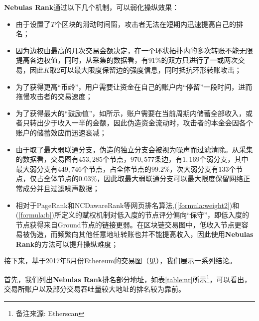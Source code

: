 \textbf{Nebulas Rank}通过以下几个机制，可以弱化操纵效果：
\begin{itemize}
	\item 由于设置了$T$个区块的滑动时间窗，攻击者无法在短期内迅速提高自己的排名；
	\item 因为边权由最高的几次交易金额决定，在一个环状拓扑内的多次转账不能无限提高各边权值，同时，从采集的数据看，有$91\%$的双方只进行了一或两次交易，因此$K$取$2$可以最大限度保留边的强度信息，同时抵抗环形转账攻击；
	\item 为了获得更高“币龄”，用户需要让资金在自己的账户内“停留”一段时间，进而拖慢攻击者的交易速度；
	\item 为了获得最大的“鼓励值”，如所示，账户需要在当前周期内储蓄全部收入，或者只转出少于收入一半的金额，因此伪造资金流动时，攻击者的本金会因各个账户的储蓄效应而迅速衰减；
	\item 由于取了最大弱联通分支，伪造的独立分支会被视为噪声而过滤清除。从采集的数据看，交易图有$453,285$个节点，$970,577$条边，有$1,169$个弱分支，其中最大弱分支有$449,746$个节点，占全体节点的$99.2\%$，次大弱分支有$133$个节点，仅占全体节点的$0.03\%$，因此取最大弱联通分支可以最大限度保留网络正常成分并且过滤噪声数据；
	\item 相对于PageRank和NCDawareRank\cite{Nikolakopoulos2013}等网页排名算法,(\ref{formula:weight2})和(\ref{formula:b})所定义的赋权机制对低入度的节点评分偏向“保守”，即低入度的节点获得来自Ground节点的链接更弱。在区块链交易图中，低收入节点更容易被伪造，而频繁向其他任意地址转账也并不能提高收入，因此使用\textbf{Nebulas Rank}的方法可以提升操纵难度；
\end{itemize}

接下来，基于2017年5月份Ethereum的交易图（见），我们展示一系列结论。

首先，我们列出\textbf{Nebulas Rank}排名部分地址，如表\ref{table:nr}所示\footnote{备注来源: Etherscan\cite{etherscan}}，可以看出，交易所账户以及部分交易吞吐量较大地址的排名较为靠前。

\newpage


